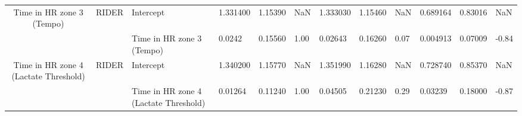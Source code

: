 \begin{tabular}{c}
Time in HR zone 3 (Tempo) & RIDER & Intercept &  1.331400 &  1.15390 &   NaN &  1.333030 &  1.15460 &   NaN &  0.689164 &  0.83016 &   NaN \\
                                      &       & Time in HR zone 3 (Tempo) &    0.0242 &  0.15560 &  1.00 &   0.02643 &  0.16260 &  0.07 &  0.004913 &  0.07009 & -0.84 \\
Time in HR zone 4 (Lactate Threshold) & RIDER & Intercept &  1.340200 &  1.15770 &   NaN &  1.351990 &  1.16280 &   NaN &  0.728740 &  0.85370 &   NaN \\
                                      &       & Time in HR zone 4 (Lactate Threshold) &   0.01264 &  0.11240 &  1.00 &   0.04505 &  0.21230 &  0.29 &   0.03239 &  0.18000 & -0.87 \\
\bottomrule
\end{tabular}
